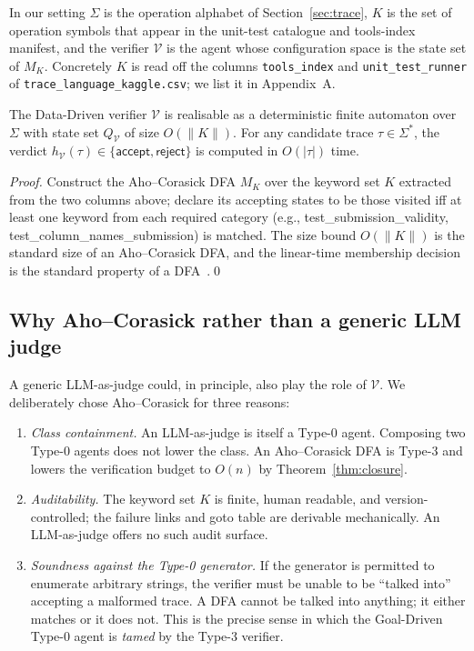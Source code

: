 In our setting $\Sigma$ is the operation alphabet of
Section~\ref{sec:trace}, $K$ is the set of operation symbols
that appear in the unit-test catalogue and tools-index manifest,
and the verifier $\mathcal{V}$ is the agent whose configuration
space is the state set of $M_K$.  Concretely $K$ is read off
the columns \texttt{tools\_index} and \texttt{unit\_test\_runner}
of \texttt{trace\_language\_kaggle.csv}; we list it in
Appendix~A.

\begin{proposition}
\label{prop:verifier-dfa}
The Data-Driven verifier $\mathcal{V}$ is realisable as a
deterministic finite automaton over $\Sigma$ with state set
$Q_\mathcal{V}$ of size $O(\|K\|)$.  For any candidate trace
$\tau\in\Sigma^*$, the verdict $h_\mathcal{V}(\tau)\in\{
\mathsf{accept},\mathsf{reject}\}$ is computed in $O(|\tau|)$
time.
\end{proposition}

\begin{proof}
Construct the Aho--Corasick DFA $M_K$ over the keyword set $K$
extracted from the two columns above; declare its accepting
states to be those visited iff at least one keyword from each
required category (e.g., \textsf{test\_submission\_validity},
\textsf{test\_column\_names\_submission}) is matched.  The size
bound $O(\|K\|)$ is the standard size of an Aho--Corasick DFA,
and the linear-time membership decision is the standard property
of a DFA~\cite{aho1975corasick,rabin1959finite}.\qed
\end{proof}

\subsection{Why Aho--Corasick rather than a generic LLM judge}

A generic LLM-as-judge could, in principle, also play the role of
$\mathcal{V}$.  We deliberately chose Aho--Corasick for three
reasons:
\begin{enumerate}
\item \emph{Class containment.}  An LLM-as-judge is itself a
Type-0 agent.  Composing two Type-0 agents does not lower the
class.  An Aho--Corasick DFA is Type-3 and lowers the
verification budget to $O(n)$ by Theorem~\ref{thm:closure}.
\item \emph{Auditability.}  The keyword set $K$ is finite, human
readable, and version-controlled; the failure links and goto
table are derivable mechanically.  An LLM-as-judge offers no
such audit surface.
\item \emph{Soundness against the Type-0 generator.}  If the
generator is permitted to enumerate arbitrary strings, the
verifier must be unable to be ``talked into'' accepting a
malformed trace.  A DFA cannot be talked into anything; it
either matches or it does not.  This is the precise sense in
which the Goal-Driven Type-0 agent is \emph{tamed} by the
Type-3 verifier.
\end{enumerate}

